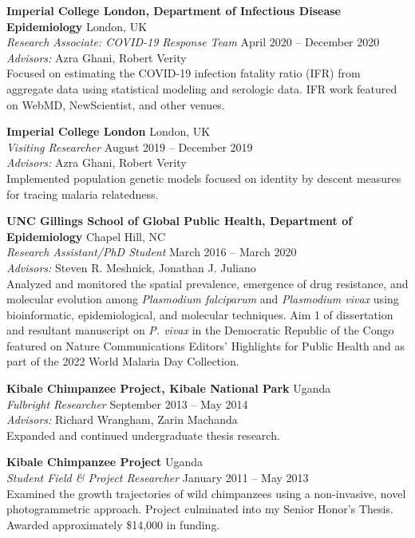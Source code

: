 \documentclass[11pt,letterpaper]{article}
\newcommand{\entry}[4]{%
  \textbf{#1} \hfill #2 \\
  \textit{#3} \hfill #4 \\[2pt]
}
\begin{document}
\entry{Imperial College London, Department of Infectious Disease Epidemiology}{London, UK}{Research Associate: COVID-19 Response Team}{April 2020 -- December 2020}
\textit{Advisors:} Azra Ghani, Robert Verity \\[2pt]
Focused on estimating the COVID-19 infection fatality ratio (IFR) from aggregate data using statistical modeling and serologic data. IFR work featured on WebMD, NewScientist, and other venues.

\vspace{12pt}

\entry{Imperial College London}{London, UK}{Visiting Researcher}{August 2019 -- December 2019}
\textit{Advisors:} Azra Ghani, Robert Verity \\[2pt]
Implemented population genetic models focused on identity by descent measures for tracing malaria relatedness.

\vspace{12pt}

\entry{UNC Gillings School of Global Public Health, Department of Epidemiology}{Chapel Hill, NC}{Research Assistant/PhD Student}{March 2016 -- March 2020}
\textit{Advisors:} Steven R. Meshnick, Jonathan J. Juliano \\[2pt]
Analyzed and monitored the spatial prevalence, emergence of drug resistance, and molecular evolution among \textit{Plasmodium falciparum} and \textit{Plasmodium vivax} using bioinformatic, epidemiological, and molecular techniques. Aim 1 of dissertation and resultant manuscript on \textit{P. vivax} in the Democratic Republic of the Congo featured on Nature Communications Editors' Highlights for Public Health and as part of the 2022 World Malaria Day Collection.

\vspace{12pt}

\entry{Kibale Chimpanzee Project, Kibale National Park}{Uganda}{Fulbright Researcher}{September 2013 -- May 2014}
\textit{Advisors:} Richard Wrangham, Zarin Machanda \\[2pt]
Expanded and continued undergraduate thesis research.

\vspace{12pt}

\entry{Kibale Chimpanzee Project}{Uganda}{Student Field \& Project Researcher}{January 2011 -- May 2013}
Examined the growth trajectories of wild chimpanzees using a non-invasive, novel photogrammetric approach. Project culminated into my Senior Honor's Thesis. Awarded approximately \$14,000 in funding.
\end{document}
